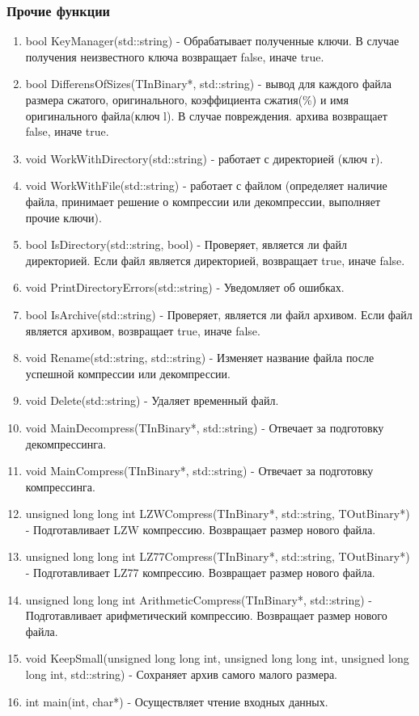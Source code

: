 \documentclass[12pt]{article}
\begin{document}
\subsubsection*{Прочие функции} %
\noindent
\begin{enumerate}
	\item bool KeyManager(std::string) - Обрабатывает полученные ключи. В случае получения неизвестного ключа возвращает false, иначе true.
	\item bool DifferensOfSizes(TInBinary*, std::string) - вывод для каждого файла размера сжатого, оригинального, коэффициента сжатия(\%) и имя оригинального файла(ключ l). В случае повреждения. архива возвращает false, иначе true.
	\item void WorkWithDirectory(std::string) - работает с директорией (ключ r).
	\item void WorkWithFile(std::string) - работает с файлом (определяет наличие файла, принимает решение о компрессии или декомпрессии, выполняет прочие ключи).
	\item bool IsDirectory(std::string, bool) - Проверяет, является ли файл директорией. Если файл является директорией, возвращает true, иначе false.
	\item void PrintDirectoryErrors(std::string) - Уведомляет об ошибках.
	\item bool IsArchive(std::string) - Проверяет, является ли файл архивом. Если файл является архивом, возвращает true, иначе false.
	\item void Rename(std::string, std::string) - Изменяет название файла после успешной компрессии или декомпрессии.
	\item void Delete(std::string) - Удаляет временный файл.
	\item void MainDecompress(TInBinary*, std::string) - Отвечает за подготовку декомпрессинга.
	\item void MainCompress(TInBinary*, std::string) - Отвечает за подготовку компрессинга.
	\item unsigned long long int LZWCompress(TInBinary*, std::string, TOutBinary*) - Подготавливает LZW компрессию. Возвращает размер нового файла.
	\item unsigned long long int LZ77Compress(TInBinary*, std::string, TOutBinary*) - Подготавливает LZ77 компрессию. Возвращает размер нового файла.
	\item unsigned long long int ArithmeticCompress(TInBinary*, std::string) - Подготавливает арифметический компрессию. Возвращает размер нового файла.
	\item void KeepSmall(unsigned long long int, unsigned long long int,
	unsigned long long int, std::string) - Сохраняет архив самого малого размера.
	\item int main(int, char*) - Осуществляет чтение входных данных.
\end{enumerate}
\end{document}

